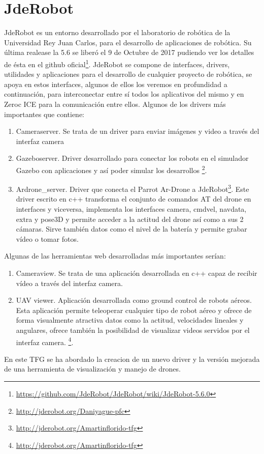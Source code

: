 \section{JdeRobot}
\label{sec:jderobot}

JdeRobot\cite{jderobot} es un entorno desarrollado por el laboratorio de robótica de la Universidad Rey Juan Carlos, para el desarrollo de aplicaciones de robótica. Su última realease la 5.6 se liberó el 9 de Octubre de 2017 pudiendo ver los detalles de ésta en el github oficial\footnote{\url{https://github.com/JdeRobot/JdeRobot/wiki/JdeRobot-5.6.0}}.
JdeRobot se compone de interfaces, drivers, utilidades y aplicaciones para el desarrollo de cualquier proyecto de robótica, se apoya en estos interfaces, algunos de ellos los veremos en profundidad a continuación, para interconectar entre sí todos los aplicativos del mismo y en Zeroc ICE para la comunicaci\'on entre ellos.
Algunos de los drivers más importantes que contiene:
\begin{enumerate}
\item Cameraserver. Se trata de un driver para enviar imágenes y video a través del interfaz camera
\item Gazeboserver. Driver desarrollado para conectar los robots en el simulador Gazebo con aplicaciones y así poder simular los desarrollos \footnote{\url{http://jderobot.org/Daniyague-pfc}}.
\item Ardrone\_server. Driver que conecta el Parrot Ar-Drone a JdeRobot\footnote{\url{http://jderobot.org/Amartinflorido-tfg}}. Este driver escrito en c++ transforma el conjunto de comandos AT del drone en interfaces y viceversa, implementa los interfaces camera, cmdvel, navdata, extra y pose3D y permite acceder a la actitud del drone así como a sus 2 cámaras. Sirve también datos como el nivel de la batería y permite grabar vídeo o tomar fotos.
\end{enumerate}
Algunas de las herramientas web desarrolladas más importantes serían:
\begin{enumerate}
\item Cameraview. Se trata de una aplicaci\'on desarrollada en c++ capaz de recibir vídeo a través del interfaz camera.
\item UAV viewer. Aplicaci\'on desarrollada como ground control de robots aéreos. Esta aplicaci\'on permite teleoperar cualquier tipo de robot aéreo y ofrece de forma visualmente atractiva datos como la actitud, velocidades lineales y angulares, ofrece también la posibilidad de visualizar videos servidos por el interfaz camera. \footnote{\url{http://jderobot.org/Amartinflorido-tfg}}.
\end{enumerate}
En este TFG se ha abordado la creacion de un nuevo driver y la versión mejorada de una herramienta de visualización y manejo de drones.

